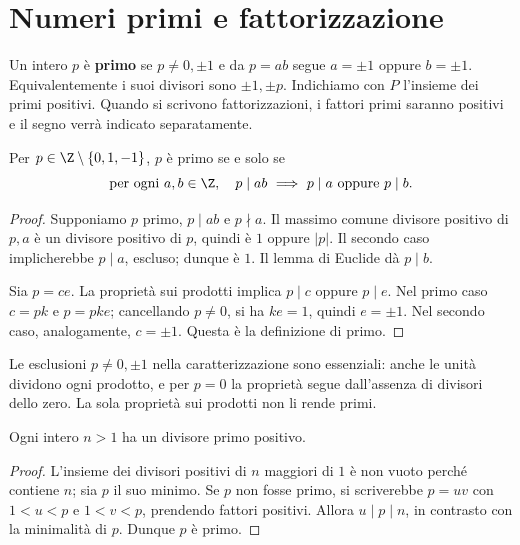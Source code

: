 \section{Numeri primi e fattorizzazione}
\begin{definizione}
Un intero $p$ è \textbf{primo} se $p\ne0,\pm1$ e da $p=ab$ segue $a=\pm1$ oppure $b=\pm1$. Equivalentemente i suoi divisori sono $\pm1,\pm p$. Indichiamo con $P$ l'insieme dei primi positivi. Quando si scrivono fattorizzazioni, i fattori primi saranno positivi e il segno verrà indicato separatamente.
\end{definizione}

\begin{proposizione}\label{prop:primo-prodotto}
Per $p\in\Z\setminus\{0,1,-1\}$, $p$ è primo se e solo se
\[
\text{per ogni }a,b\in\Z,\quad p\mid ab\ \Longrightarrow\ p\mid a\ \text{oppure}\ p\mid b.
\]
\end{proposizione}
\begin{proof}
\passomath{\Rightarrow} Supponiamo $p$ primo, $p\mid ab$ e $p\nmid a$. Il massimo comune divisore positivo di $p,a$ è un divisore positivo di $p$, quindi è $1$ oppure $|p|$. Il secondo caso implicherebbe $p\mid a$, escluso; dunque è $1$. Il lemma di Euclide dà $p\mid b$.

\passomath{\Leftarrow} Sia $p=ce$. La proprietà sui prodotti implica $p\mid c$ oppure $p\mid e$. Nel primo caso $c=pk$ e $p=pke$; cancellando $p\ne0$, si ha $ke=1$, quindi $e=\pm1$. Nel secondo caso, analogamente, $c=\pm1$. Questa è la definizione di primo.
\end{proof}

\begin{osservazione}
Le esclusioni $p\ne0,\pm1$ nella caratterizzazione sono essenziali: anche le unità dividono ogni prodotto, e per $p=0$ la proprietà segue dall'assenza di divisori dello zero. La sola proprietà sui prodotti non li rende primi.
\end{osservazione}

\begin{lemma}
Ogni intero $n>1$ ha un divisore primo positivo.
\end{lemma}
\begin{proof}
L'insieme dei divisori positivi di $n$ maggiori di $1$ è non vuoto perché contiene $n$; sia $p$ il suo minimo. Se $p$ non fosse primo, si scriverebbe $p=uv$ con $1<u<p$ e $1<v<p$, prendendo fattori positivi. Allora $u\mid p\mid n$, in contrasto con la minimalità di $p$. Dunque $p$ è primo.
\end{proof}

